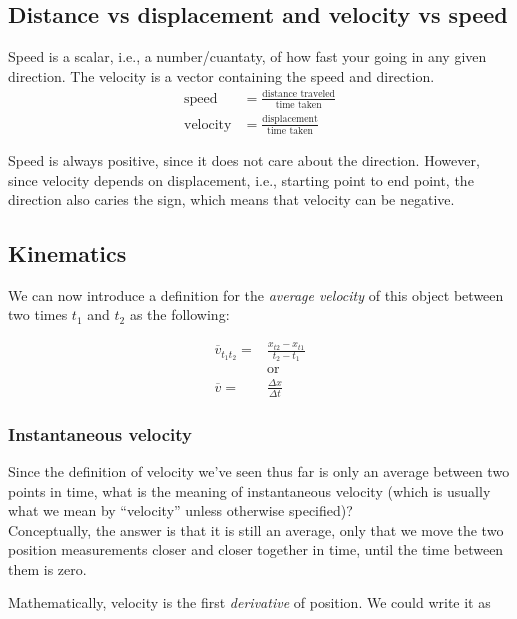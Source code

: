 \subsection{Distance vs displacement and velocity vs speed}
Speed is a scalar, i.e., a number/cuantaty, of how fast your going in any given direction. 
The velocity is a vector containing the speed and direction.
\begin{align}
 \text{speed} &= \frac{\text{distance traveled}}{\text{time taken}}\\
 \text{velocity} &= \frac{\text{displacement}}{\text{time taken}}
\end{align}

Speed is always positive, since it does not care about the direction.
However, since velocity depends on displacement, i.e., starting point to end point,
the direction also caries the sign, which means that velocity can be negative.


\subsection{Kinematics}

We can now introduce a definition for the \emph{average velocity} of this object between two times $t_1$ and $t_2$ as the following:

\begingroup
\large
\begin{align*}
 \overbar{v}_{t_1 t_2} = &\frac{x_{t2} - x_{t1}}{t_2 - t_1} \\
 &\text{or} \\
 \overbar{v} = &\frac{\Delta x}{\Delta t}
\end{align*}
\endgroup


\subsubsection{Instantaneous velocity}

Since the definition of velocity we've seen thus far is only an average between two points in time, what is the meaning of instantaneous velocity (which is usually what we mean by ``velocity'' unless otherwise specified)?\\
Conceptually, the answer is that it is still an average, only that we move the two position measurements closer and closer together in time, until the time between them is zero.

Mathematically, velocity is the first \emph{derivative} of position.
We could write it as

